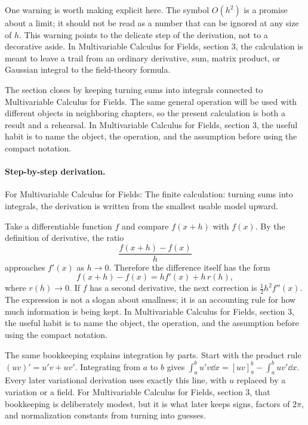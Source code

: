 One warning is worth making explicit here.  The symbol \(O(h^2)\) is a promise about a limit; it should not be read as a number that can be ignored at any size of \(h\).  This warning points to the delicate step of the derivation, not to a decorative aside.  In Multivariable Calculus for Fields, section 3, the calculation is meant to leave a trail from an ordinary derivative, sum, matrix product, or Gaussian integral to the field-theory formula.

The section closes by keeping turning sums into integrals connected to Multivariable Calculus for Fields.  The same general operation will be used with different objects in neighboring chapters, so the present calculation is both a result and a rehearsal.  In Multivariable Calculus for Fields, section 3, the useful habit is to name the object, the operation, and the assumption before using the compact notation.



\paragraph{Step-by-step derivation.}

For Multivariable Calculus for Fields: The finite calculation: turning sums into integrals, the derivation is written from the smallest usable model upward.

Take a differentiable function \(f\) and compare \(f(x+h)\) with \(f(x)\).  By the definition of derivative, the ratio
\[
  \frac{f(x+h)-f(x)}{h}
\]
approaches \(f'(x)\) as \(h\to0\).  Therefore the difference itself has the form
\[
  f(x+h)-f(x)=hf'(x)+h\,r(h),
\]
where \(r(h)\to0\).  If \(f\) has a second derivative, the next correction is \(\frac12h^2f''(x)\).  The expression is not a slogan about smallness; it is an accounting rule for how much information is being kept.  In Multivariable Calculus for Fields, section 3, the useful habit is to name the object, the operation, and the assumption before using the compact notation.

The same bookkeeping explains integration by parts.  Start with the product rule \((uv)'=u'v+uv'\).  Integrating from \(a\) to \(b\) gives \(\int_a^b u'v\dd x=[uv]_a^b-\int_a^buv'\dd x\).  Every later variational derivation uses exactly this line, with \(u\) replaced by a variation or a field.  For Multivariable Calculus for Fields, section 3, that bookkeeping is deliberately modest, but it is what later keeps signs, factors of \(2\pi\), and normalization constants from turning into guesses.

